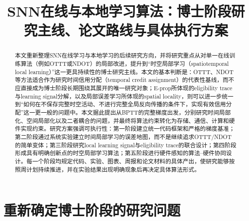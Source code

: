 \documentclass[journal,12pt,onecolumn]{IEEEtran}
\begin{document}
\title{SNN在线与本地学习算法：博士阶段研究主线、论文路线与具体执行方案}
\author{}
\date{}

\maketitle

\begin{abstract}
本文重新整理SNN在线学习与本地学习的后续研究方向，并将研究重点从对单一在线训练算法（例如OTTT或NDOT）的局部改进，提升到“时空局部学习（spatiotemporal local learning）”这一更具持续性的博士研究主线。本文的基本判断是：OTTT、NDOT等方法适合作为研究时间信用分配（temporal credit assignment）的代表性基线，而不应直接成为博士阶段长期围绕其展开的唯一研究对象；E-prop所体现的eligibility trace与learning signal分解，以及局部误差学习所体现的spatial locality，则可以进一步统一到“如何在不保存完整时空活动、不进行完整全局反向传播的条件下，实现有效信用分配”这一更一般的问题中。本文据此提出从BPTT的完整梯度出发，分别研究时间局部化、空间局部化以及二者耦合的问题，并最终将算法约束转化为存储、通信、计算和硬件实现约束。研究方案强调可执行性：第一阶段建立统一代码框架和严格的梯度基准；第二阶段通过系统实验建立时间局部学习的误差地图，而不是继续追求OTTT/NDOT的简单变体；第三阶段研究local learning signal与eligibility trace的联合设计；第四阶段形成具有明确创新点的时空局部学习算法；第五阶段进行硬件感知的算法--硬件协同设计。每一个阶段均规定代码、实验、图表、周报和论文材料的具体产出，使研究能够按照周计划持续推进，并在实验结果出现明确现象后再决定具体算法形式。
\end{abstract}

\section{重新确定博士阶段的研究问题}
\end{document}
